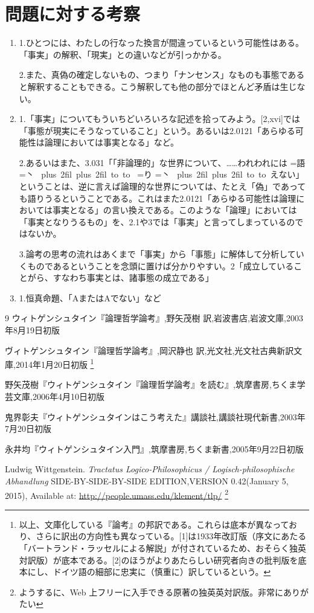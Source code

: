 \documentclass[11pt,a4paper]{jsbook}
\newcommand{\ruby}[2]{%
    \leavevmode
    \setbox0=\hbox{#1}%
    \setbox1=\hbox{\tiny #2}%
    \ifdim\wd0>\wd1 \dimen0=\wd0 \else \dimen0=\wd1 \fi
    \hbox{%
    \kanjiskip=0pt plus 2fil
    \xkanjiskip=0pt plus 2fil
    \vbox{%
    \hbox to \dimen0{%
    \tiny \hfil#2\hfil}%
    \nointerlineskip
    \hbox to \dimen0{\mathstrut\hfil#1\hfil}}}}
\begin{document}
\section{問題に対する考察}
\begin{enumerate}
\item
1.ひとつには、わたしの行なった換言が間違っているという可能性はある。「事実」の解釈、「現実」との違いなどが引っかかる。

2.また、真偽の確定しないもの、つまり「ナンセンス」なものも事態であると解釈することもできる。こう解釈しても他の部分でほとんど矛盾は生じない。
\item
1.「事実」についてもういちどいろいろな記述を拾ってみよう。[2,xvi]では「事態が現実にそうなっていること」という。あるいは2.0121「あらゆる可能性は論理においては事実となる」など。

2.あるいはまた、3.031「「非論理的」な世界について、……われわれには\ruby{語}{丶}\ruby{り}{丶}えない」ということは、逆に言えば論理的な世界については、たとえ「偽」であっても語りうるということである。これはまた2.0121「あらゆる可能性は論理においては事実となる」の言い換えである。このような「論理」においては「事実となりうるもの」を、2.1や3では「事実」と言ってしまっているのではないか。

3.論考の思考の流れはあくまで「事実」から「事態」に解体して分析していくものであるということを念頭に置けば分かりやすい。2「成立していることがら、すなわち事実とは、諸事態の成立である」
\item
1.恒真命題、「AまたはAでない」など
\end{enumerate}

\begin{thebibliography}
{9}
\bibitem{}ウィトゲンシュタイン『論理哲学論考』,野矢茂樹 訳,岩波書店,岩波文庫,2003年8月19日初版

\bibitem{}ヴィトゲンシュタイン『論理哲学論考』,岡沢静也 訳,光文社,光文社古典新訳文庫,2014年1月20日初版
\footnote{以上、文庫化している『論考』の邦訳である。これらは底本が異なっており、さらに訳出の方向性も異なっている。[1]は1933年改訂版（序文にあたる「バートランド・ラッセルによる解説」が付されているため、おそらく独英対訳版）が底本である。[2]のほうがよりあたらしい研究者向きの批判版を底本にし、ドイツ語の細部に忠実に（慎重に）訳しているという。}

\bibitem{}野矢茂樹『ウィトゲンシュタイン『論理哲学論考』を読む』,筑摩書房,ちくま学芸文庫,2006年4月10日初版

\bibitem{}鬼界彰夫『ウィトゲンシュタインはこう考えた』講談社,講談社現代新書,2003年7月20日初版

\bibitem{}永井均『ウィトゲンシュタイン入門』,筑摩書房,ちくま新書,2005年9月22日初版

\bibitem{}Ludwig Wittgenstein. {\it Tractatus Logico-Philosophicus / Logisch-philosophische Abhandlung }SIDE-BY-SIDE-BY-SIDE EDITION,VERSION 0.42(January 5, 2015), Available at: \url{http://people.umass.edu/klement/tlp/}
\footnote{ようするに、Web 上フリーに入手できる原著の独英英対訳版。非常にありがたい}


\end{thebibliography}
\end{document}

